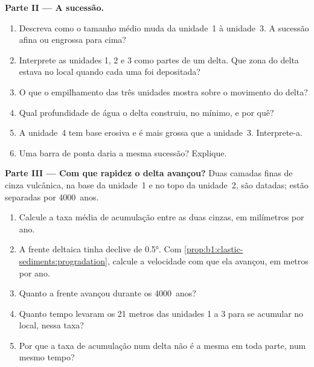 \begin{problem}
\medskip
\noindent\textbf{Parte II --- A sucessão.}
\begin{enumerate}[resume]
  \item Descreva como o tamanho médio muda da unidade~1 à unidade~3. A sucessão afina ou engrossa para cima?
  \item Interprete as unidades 1, 2 e 3 como partes de um delta. Que zona do delta estava no local quando cada uma foi depositada?
  \item O que o empilhamento das três unidades mostra sobre o movimento do delta?
  \item Qual profundidade de água o delta construiu, no mínimo, e por quê?
  \item A unidade~4 tem base erosiva e é mais grossa que a unidade~3. Interprete-a.
  \item Uma barra de ponta daria a mesma sucessão? Explique.
\end{enumerate}

\medskip
\noindent\textbf{Parte III --- Com que rapidez o delta avançou?}
Duas camadas finas de cinza vulcânica, na base da unidade~1 e no topo da unidade~2, são datadas; estão separadas por \num{4000}~anos.
\begin{enumerate}[resume]
  \item Calcule a taxa média de acumulação entre as duas cinzas, em milímetros por ano.
  \item A frente deltaica tinha declive de \ang{0.5}. Com \cref{prop:b1:clastic-sediments:progradation}, calcule a velocidade com que ela avançou, em metros por ano.
  \item Quanto a frente avançou durante os \num{4000}~anos?
  \item Quanto tempo levaram os 21 metros das unidades 1 a 3 para se acumular no local, nessa taxa?
  \item Por que a taxa de acumulação num delta não é a mesma em toda parte, num mesmo tempo?
\end{enumerate}


\end{problem}
